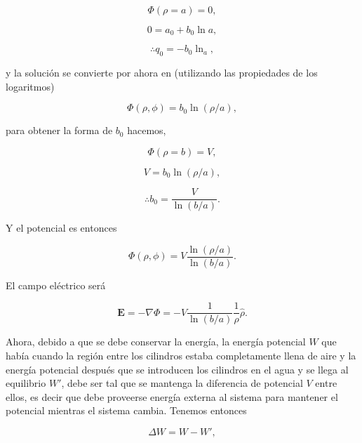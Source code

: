 \documentclass[a4paper,11pt]{article}
\numberwithin{equation}{section}
\begin{document}
\begin{equation}
 \Phi(\rho = a) = 0,
\end{equation}

\begin{equation}
 0 = a_0 + b_0\ln{a},
\end{equation}

\begin{equation}
 \therefore q_0 = - b_0 \ln_a,
\end{equation}

y la solución se convierte por ahora en (utilizando las propiedades de los logaritmos)

\begin{equation}
 \Phi(\rho,\phi) = b_0 \ln({\rho/a}),
\end{equation}

para obtener la forma de $b_0$ hacemos, 

\begin{equation}
 \Phi(\rho = b) = V,
\end{equation}

\begin{equation}
 V =  b_0 \ln({\rho/a}),
\end{equation}

\begin{equation}
 \therefore b_0 = \frac{V}{\ln{(b/a)}}.
\end{equation}

Y el potencial es entonces 

\begin{equation}
 \Phi(\rho,\phi) = V \frac{\ln{(\rho/a)}}{\ln{(b/a)}}.
\end{equation}

El campo eléctrico será 

\begin{equation}
 \mathbf{E} = -\nabla \Phi = - V \frac{1}{\ln{(b/a)}}\frac{1}{\rho} \hat{\rho}.
\end{equation}

Ahora, debido a que se debe conservar la energía, la energía potencial $W$ que 
había cuando la región entre los cilindros estaba completamente llena de aire y
la energía potencial después que se introducen los cilindros en el agua y se llega 
al equilibrio $W'$, debe ser tal que se mantenga la diferencia de potencial $V$ 
entre ellos, es decir que debe proveerse energía externa al sistema para mantener 
el potencial mientras el sistema cambia. Tenemos entonces 

\begin{equation}
 \Delta W = W - W',
\end{equation}
\end{document}

